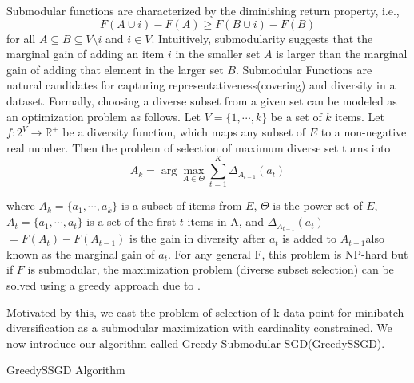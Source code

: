 \documentclass[a4paper,twoside]{iiththesis}
\theoremstyle{definition}
\theoremstyle{definition}
\theoremstyle{remark}
\begin{document}
Submodular functions are characterized by the diminishing return property, i.e.,
\begin{equation}
F(A \cup {i}) - F(A) \geq F(B \cup {i}) - F(B)
\end{equation}
for all $A \subseteq B \subseteq V \setminus i$ and $i \in V$. Intuitively, submodularity suggests that the marginal gain of adding an item $i$ in the smaller set $A$ is larger than the marginal gain of adding that element in the larger set $B$. Submodular Functions are natural candidates for capturing representativeness(covering) and diversity in a dataset. Formally, choosing a diverse subset from a given set can be modeled as an optimization problem as follows. Let $V = \{1,\cdots,k\}$ be a set of $k$ items. Let $f : 2^V \rightarrow \mathbb{R}^+$ be a diversity function, which maps any subset of $E$ to a non-negative real number. Then the problem of selection of maximum diverse set\cite{ashkan2015optimal} turns into 
\begin{equation}
A_k = \arg\max_{A \in \Theta} \sum_{t=1}^K \Delta_{A_{t-1}}(a_t) \label{Maximisation}
\end{equation}


where $A_k = \{a_1,\cdots,a_k\}$ is a subset of items from $E$, $\Theta$ is the power set of $E$, $A_t = \{a_1,\cdots,a_t\}$ is a set of the first $t$ items in A, 
and $\Delta_{A_{t-1}}(a_t)$ $=F(A_t) - F(A_{t-1})$ is the gain in diversity after $a_t$ is added to $A_{t-1}$also known as the marginal gain of $a_t$. For any general F, this problem is NP-hard but if $F$ is submodular, the maximization problem (diverse subset selection) can be solved using a greedy approach due to \cite{nemhauser}. 

Motivated by this, we cast the problem of selection of k data point for minibatch diversification as a submodular maximization with cardinality constrained. We now introduce our algorithm called Greedy Submodular-SGD(GreedySSGD).

\begin{algorithm}
\caption{GreedySSGD Algorithm}
\label{sSGD-1}
\end{algorithm}
\end{document}
